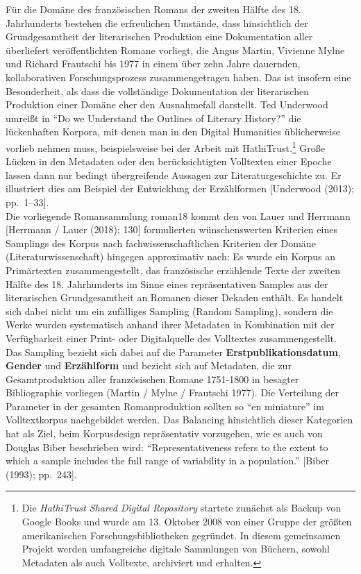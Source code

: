 \documentclass[
  12pt,
  letterpaper,
  DIV=11,
  numbers=noendperiod]{scrreprt}
\begin{document}
Für die Domäne des französischen Romans der zweiten Hälfte des 18.
Jahrhunderts bestehen die erfreulichen Umstände, dass hinsichtlich der
Grundgesamtheit der literarischen Produktion eine Dokumentation aller
überliefert veröffentlichten Romane vorliegt, die Angus Martin, Vivienne
Mylne und Richard Frautschi bis 1977 in einem über zehn Jahre dauernden,
kollaborativen Forschungsprozess zusammengetragen haben. Das ist
insofern eine Besonderheit, als dass die vollständige Dokumentation der
literarischen Produktion einer Domäne eher den Ausnahmefall darstellt.
Ted Underwood umreißt in ``Do we Understand the Outlines of Literary
History?'' die lückenhaften Korpora, mit denen man in den Digital
Humanities üblicherweise vorlieb nehmen muss, beispielsweise bei der
Arbeit mit HathiTrust.\footnote{Die \emph{HathiTrust Shared Digital
  Repository} startete zunächst als Backup von Google Books und wurde am
  13. Oktober 2008 von einer Gruppe der größten amerikanischen
  Forschungsbibliotheken gegründet. In diesem gemeinsamen Projekt werden
  umfangreiche digitale Sammlungen von Büchern, sowohl Metadaten als
  auch Volltexte, archiviert und erhalten.} Große Lücken in den
Metadaten oder den berücksichtigten Volltexten einer Epoche lassen dann
nur bedingt übergreifende Aussagen zur Literaturgeschichte zu. Er
illustriert dies am Beispiel der Entwicklung der Erzählformen
{[}Underwood (2013); pp.~1--33{]}.\\
Die vorliegende Romansammlung roman18 kommt den von Lauer und Herrmann
{[}Herrmann / Lauer (2018); 130{]} formulierten wünschenswerten
Kriterien eines Samplings des Korpus nach fachwissenschaftlichen
Kriterien der Domäne (Literaturwissenschaft) hingegen approximativ nach:
Es wurde ein Korpus an Primärtexten zusammengestellt, das französische
erzählende Texte der zweiten Hälfte des 18. Jahrhunderts im Sinne eines
repräsentativen Samples aus der literarischen Grundgesamtheit an Romanen
dieser Dekaden enthält. Es handelt sich dabei nicht um ein zufälliges
Sampling (Random Sampling), sondern die Werke wurden systematisch anhand
ihrer Metadaten in Kombination mit der Verfügbarkeit einer Print- oder
Digitalquelle des Volltextes zusammengestellt.\\
Das Sampling bezieht sich dabei auf die Parameter
\textbf{Erstpublikationsdatum}, \textbf{Gender} und \textbf{Erzählform}
und bezieht sich auf Metadaten, die zur Gesamtproduktion aller
französischen Romane 1751-1800 in besagter Bibliographie vorliegen
(Martin / Mylne / Frautschi 1977). Die Verteilung der Parameter in der
gesamten Romanproduktion sollten so ``en miniature'' im Volltextkorpus
nachgebildet werden. Das Balancing hinsichtlich dieser Kategorien hat
als Ziel, beim Korpusdesign repräsentativ vorzugehen, wie es auch von
Douglas Biber beschrieben wird: ``Representativeness refers to the
extent to which a sample includes the full range of variability in a
population.'' {[}Biber (1993); pp.~243{]}.
\end{document}
